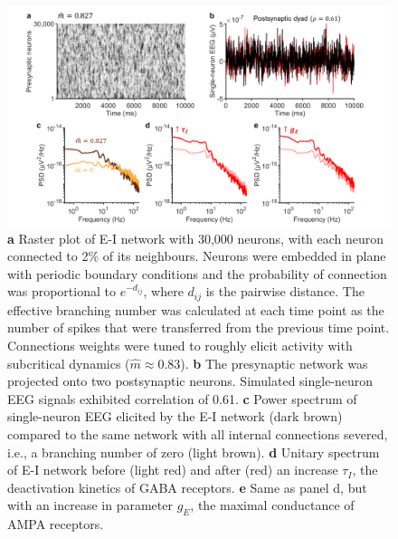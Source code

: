 \begin{figure}[t]
\centering
\includegraphics[width=14cm]{Figures/Discussion/subcritical_network.png}
\vspace{-1em}
\caption{
\textbf{a} Raster plot of E-I network with 30,000 neurons, with each neuron connected to 2\% of its neighbours. Neurons were embedded in plane with periodic boundary conditions and the probability of connection was proportional to $e^{-d_{ij}}$, where $d_{ij}$ is the pairwise distance. The effective branching number was calculated at each time point as the number of spikes that were transferred from the previous time point. Connections weights were tuned to roughly elicit activity with subcritical dynamics ($\hat{m}\approx0.83$).
\textbf{b} The presynaptic network was projected onto two postsynaptic neurons. Simulated single-neuron EEG signals exhibited correlation of 0.61. 
\textbf{c} Power spectrum of single-neuron EEG elicited by the E-I network (dark brown) compared to the same network with all internal connections severed, i.e., a branching number of zero (light brown).
\textbf{d} Unitary spectrum of E-I network before (light red) and after (red) an increase $\tau_I$, the deactivation kinetics of GABA receptors. 
\textbf{e} Same as panel d, but with an increase in parameter $g_E$, the maximal conductance of AMPA receptors.}
\label{fig:EI_crit}
\vspace{-1em}
\end{figure}

